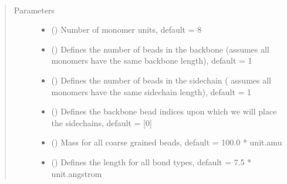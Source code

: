 \documentclass[letterpaper,12pt,english,openany,oneside]{sphinxmanual}
\begin{document}
\begin{fulllineitems}
\label{\detokenize{cg_model:cg_model.cgmodel.basic_cgmodel}}~\begin{quote}\begin{description}
\item[{Parameters}] \leavevmode\begin{itemize}
\item {} 
 () \textendash{} Number of monomer units, default = 8

\item {} 
 () \textendash{} Defines the number of beads in the backbone (assumes all monomers have the same backbone length), default = 1

\item {} 
 () \textendash{} Defines the number of beads in the sidechain ( assumes all monomers have the same sidechain length), default = 1

\item {} 
 (\sphinxstyleliteralemphasis{\sphinxupquote{( }}\sphinxstyleliteralemphasis{\sphinxupquote{ )}}) \textendash{} Defines the backbone bead indices upon which we will place the sidechains, default = {[}0{]}

\item {} 
 () \textendash{} Mass for all coarse grained beads, default = 100.0 * unit.amu

\item {} 
 () \textendash{} Defines the length for all bond types, default = 7.5 * unit.angstrom


\end{itemize}
\end{description}
\end{quote}
\end{fulllineitems}
\end{document}

